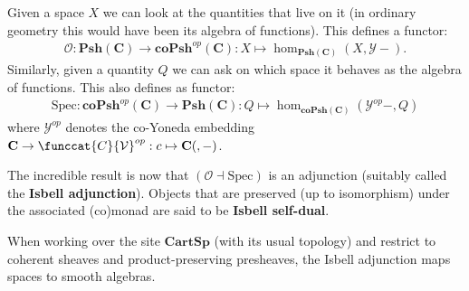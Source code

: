     \begin{property}
        Given a space $X$ we can look at the quantities that live on it (in ordinary geometry this would have been its algebra of functions). This defines a functor:
        \begin{gather}
            \mathcal{O}:\mathbf{Psh(C)}\rightarrow\mathbf{coPsh}^{op}(\mathbf{C}):X\mapsto\hom_{\mathbf{Psh(C)}}(X, \mathcal{Y}-).
        \end{gather}
        Similarly, given a quantity $Q$ we can ask on which space it behaves as the algebra of functions. This also defines as functor:
        \begin{gather}
            \text{Spec}:\mathbf{coPsh}^{op}(\mathbf{C})\rightarrow\mathbf{Psh(C)}:Q\mapsto\hom_{\mathbf{coPsh(C)}}(\mathcal{Y}^{op}-, Q)
        \end{gather}
        where $\mathcal{Y}^{op}$ denotes the co-Yoneda embedding $\mathbf{C}\rightarrow\funccat{C}{\mathcal{V}}^{op}:c\mapsto\mathbf{C}(, -)$.

        The incredible result is now that $(\mathcal{O}\dashv\text{Spec})$ is an adjunction (suitably called the \textbf{Isbell adjunction}). Objects that are preserved (up to isomorphism) under the associated (co)monad are said to be \textbf{Isbell self-dual}.
    \end{property}
    \begin{example}
        When working over the site $\mathbf{CartSp}$ (with its usual topology) and restrict to coherent sheaves and product-preserving presheaves, the Isbell adjunction maps spaces to smooth algebras.
    \end{example}